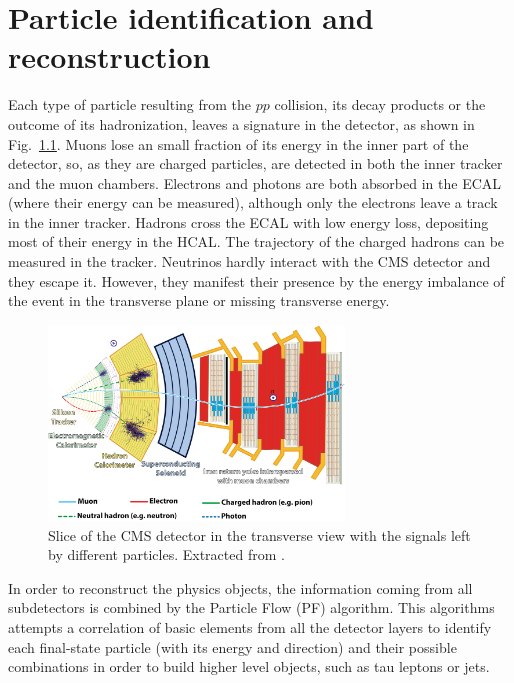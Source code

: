 \documentclass[../main.tex]{subfiles}
\begin{document}
\chapter{Particle identification and reconstruction}
\label{intro:sec:id}

Each type of particle resulting from the $pp$ collision, its decay products or the outcome of its hadronization, leaves a signature in the detector, as shown in Fig.~\ref{intro:fig:cms_slice}. Muons lose an small fraction of its energy in the inner part of the detector, so, as they are charged particles, are detected in both the inner tracker and the muon chambers. Electrons and photons are both absorbed in the ECAL (where their energy can be measured), although only the electrons leave a track in the inner tracker. Hadrons cross the ECAL with low energy loss, depositing most of their energy in the HCAL. The trajectory of the charged hadrons can be measured in the tracker. Neutrinos hardly interact with the CMS detector and they escape it. However, they manifest their presence by the energy imbalance of the event in the transverse plane or missing transverse energy.

\begin{figure}[h!]
\begin{center}

\includegraphics[width=0.7\textwidth]{Images/CMSslice_whiteBackground}
\end{center}
\caption{Slice of the CMS detector in the transverse view with the signals left by different particles. Extracted from \cite{hh:intro:cms_slice}.}
\label{intro:fig:cms_slice}
\end{figure}

In order to reconstruct the physics objects, the information coming from all subdetectors is combined by the Particle Flow (PF) \cite{intro:id:pf}  algorithm. This algorithms attempts a correlation of basic elements from all the detector layers to identify each final-state particle (with its energy and direction) and their possible combinations in order to build higher level objects, such as tau leptons or jets.
\end{document}
